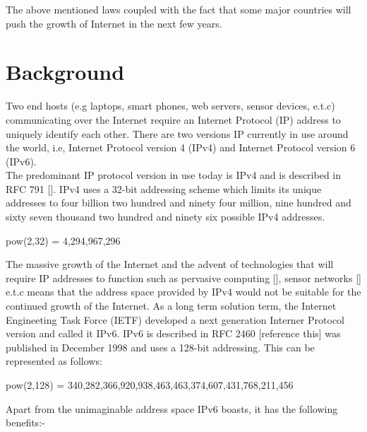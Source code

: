 \documentclass[iwp,first]{luthesis}
\begin{document}
The above mentioned laws coupled with the fact that some major countries will push the growth of Internet in the next few years.  


\section{Background}

Two end hosts (e.g laptops, smart phones, web servers, sensor devices, e.t.c) communicating over the Internet require an Internet Protocol (IP) address to uniquely identify each other. There are two versions IP currently in use around the world, i.e, Internet Protocol version 4 (IPv4) and Internet Protocol version 6 (IPv6).
\\The predominant IP protocol version in use today is IPv4 and is described in RFC 791 []. IPv4 uses a 32-bit addressing scheme which limits its unique addresses to four billion two hundred and ninety four million, nine hundred and sixty seven thousand two hundred and ninety six possible IPv4 addresses. 

\begin{center}      pow(2,32) = 4,294,967,296     \end{center}

The massive growth of the Internet and the advent of technologies that will require IP addresses to function such as pervasive computing [], sensor networks [] e.t.c means that the address space provided by IPv4 would not be suitable for the continued growth of the Internet. As a long term solution term, the Internet Engineeting Task Force (IETF) developed a next generation Interner Protocol version and called it IPv6. IPv6 is described in RFC 2460 [reference this] was published in December 1998 and uses a 128-bit addressing. This can be represented as follows:

\begin{center}     pow(2,128) = 340,282,366,920,938,463,463,374,607,431,768,211,456      \end{center}

Apart from the unimaginable address space IPv6 boasts, it has the following benefits:-
\end{document}

